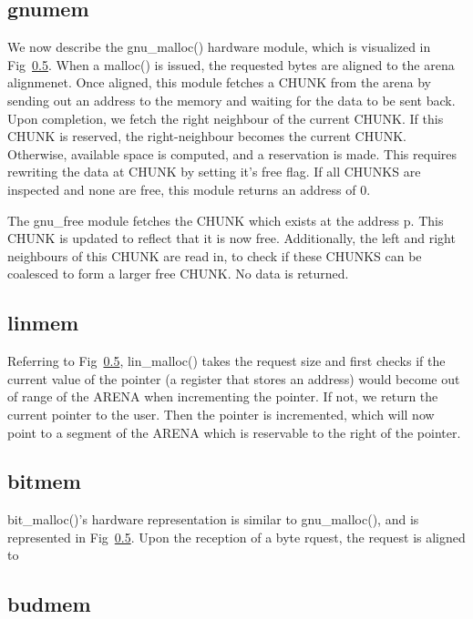 

\subsection{gnumem}


	We now describe the gnu\_malloc() hardware module, which is visualized in Fig~\ref{}. When a malloc() is issued, the requested bytes are aligned to the arena alignmenet. Once aligned, this module fetches a CHUNK from the arena by sending out an address to the memory and waiting for the data to be sent back. Upon completion, we fetch the right neighbour of the current CHUNK. If this CHUNK is reserved, the right-neighbour becomes the current CHUNK. Otherwise, available space is computed, and a reservation is made. This requires rewriting the data at CHUNK by setting it's free flag. If all CHUNKS are inspected and none are free, this module returns an address of 0.  

	The gnu\_free module fetches the CHUNK which exists at the address p. This CHUNK is updated to reflect that it is now free. Additionally, the left and right neighbours of this CHUNK are read in, to check if these CHUNKS can be coalesced to form a larger free CHUNK. No data is returned. 


\subsection{linmem}

	Referring to Fig~\ref{}, lin\_malloc() takes the request size and first checks if the current value of the pointer (a register that stores an address) would become out of range of the ARENA when incrementing the pointer. If not, we return the current pointer to the user. Then the pointer is incremented, which will now point to a segment of the ARENA which is reservable to the right of the pointer.


\subsection{bitmem}

	bit\_malloc()'s hardware representation is similar to gnu\_malloc(), and is represented in Fig~\ref{}. Upon the reception of a byte rquest, the request is aligned to 


\subsection{budmem}

	

\subsection{}